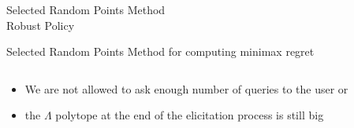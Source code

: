 \documentclass{beamer}
\newcommand\Fontvi{\fontsize{9}{10.2}\selectfont}
\begin{document}
\begin{frame}
\begin{center}
Selected Random Points Method ~\\
{\color{red} Robust Policy}
\end{center}
\end{frame}

\begin{frame}{Selected Random Points Method for computing minimax regret}
\Fontvi
\begin{columns}
\begin{column}{.45\textwidth}

\begin{itemize}
\item We are not allowed to ask enough number of queries to the user or
\item the $\Lambda$ polytope at the end of the elicitation process is still big
\end{itemize} 


\end{column}
\end{columns}
\end{frame}
\end{document}
